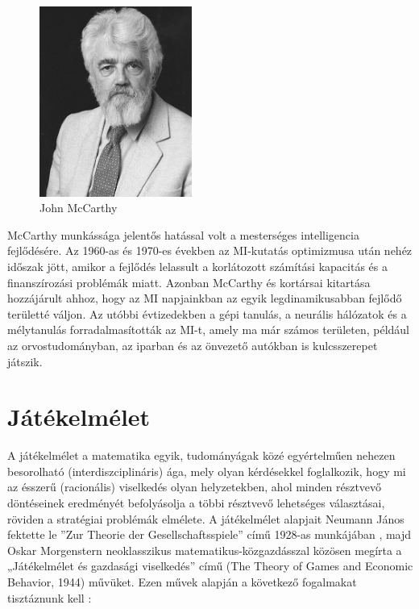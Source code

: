 \documentclass[
]{thesis-ekf}
\theoremstyle{definition}
\theoremstyle{remark}
\begin{document}
\begin{figure}[h!]
	\centering
	\includegraphics[width=5cm]{./pictures/John_McCarthy.png}
	\caption{John McCarthy}
	\label{McCarthy}
\end{figure}

McCarthy munkássága jelentős hatással volt a mesterséges intelligencia fejlődésére. Az 1960-as és 1970-es években az MI-kutatás optimizmusa után nehéz időszak jött, amikor a fejlődés lelassult a korlátozott számítási kapacitás és a finanszírozási problémák miatt. Azonban McCarthy és kortársai kitartása hozzájárult ahhoz, hogy az MI napjainkban az egyik legdinamikusabban fejlődő területté váljon. Az utóbbi évtizedekben a gépi tanulás, a neurális hálózatok és a mélytanulás forradalmasították az MI-t, amely ma már számos területen, például az orvostudományban, az iparban és az önvezető autókban is kulcsszerepet játszik. \cite{JohnMcCarthy}

\section{Játékelmélet}

A játékelmélet a matematika egyik, tudományágak közé egyértelműen nehezen besorolható (interdiszciplináris) ága, mely olyan kérdésekkel foglalkozik, hogy mi az ésszerű (racionális) viselkedés olyan helyzetekben, ahol minden résztvevő döntéseinek eredményét befolyásolja a többi résztvevő lehetséges választásai, röviden a stratégiai problémák elmélete. A játékelmélet alapjait Neumann János fektette le ''Zur Theorie der Gesellschaftsspiele'' című 1928-as munkájában \cite{Neumann}, majd Oskar Morgenstern neoklasszikus matematikus-közgazdásszal közösen megírta a „Játékelmélet és gazdasági viselkedés” című (The Theory of Games and Economic Behavior, 1944) művüket. \cite{Jatekelmelet,JatekelmeletEn} Ezen művek alapján a következő fogalmakat tisztáznunk kell \cite{NeumannOskar}:
\end{document}
